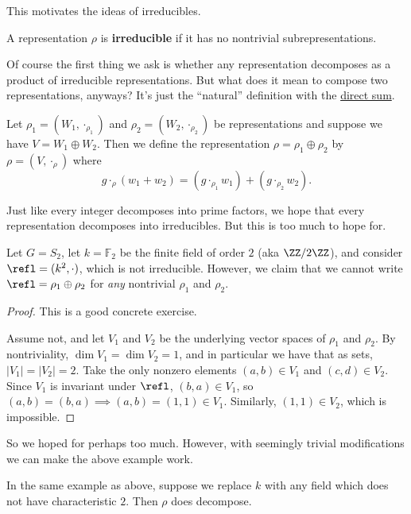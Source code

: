 This motivates the ideas of irreducibles.
\begin{definition}
	A representation $\rho$ is \textbf{irreducible} if it has no nontrivial subrepresentations.
\end{definition}

Of course the first thing we ask is whether any representation decomposes as a product of irreducible representations.
But what does it mean to compose two representations, anyways? It's just the ``natural'' definition with the \href{http://en.wikipedia.org/wiki/Direct_sum}{direct sum}.
\begin{definition}
	Let $\rho_1 = (W_1, \cdot_{\rho_1})$ and $\rho_2 = (W_2, \cdot_{\rho_2})$ be representations and suppose we have $V = W_1 \oplus W_2$.
	Then we define the representation $\rho = \rho_1 \oplus \rho_2$
	by $\rho = (V, \cdot_\rho)$ where
	\[
		g \cdot_\rho (w_1 + w_2)
		= (g \cdot_{\rho_1} w_1)
		+ (g \cdot_{\rho_2} w_2).
	\]
\end{definition}
Just like every integer decomposes into prime factors, we hope that every representation decomposes into irreducibles.
But this is too much to hope for.
\begin{example}
	Let $G = S_2$, let $k = \mathbb F_2$ be the finite field of order $2$ (aka $\ZZ/2\ZZ$), and consider $\refl = (k^2, \cdot)$, which is not irreducible.
	However, we claim that we cannot write $\refl = \rho_1 \oplus \rho_2$
	for \emph{any} nontrivial $\rho_1$ and $\rho_2$.
\end{example}
\begin{proof}
	This is a good concrete exercise.

	Assume not, and let $V_1$ and $V_2$ be the underlying vector spaces of $\rho_1$ and $\rho_2$.
	By nontriviality, $\dim V_1 = \dim V_2 = 1$,
	and in particular we have that as sets, $\left\lvert V_1 \right\rvert = \left\lvert V_2 \right\rvert = 2$.
	Take the only nonzero elements $(a,b) \in V_1$ and $(c,d) \in V_2$.
	Since $V_1$ is invariant under $\refl$, $(b,a) \in V_1$, so $(a,b) = (b,a) \implies (a,b) = (1,1) \in V_1$.
	Similarly, $(1,1) \in V_2$, which is impossible.
\end{proof}
So we hoped for perhaps too much.
However, with seemingly trivial modifications we can make the above example work.
\begin{example}
	In the same example as above, suppose we replace $k$ with any field which does not have characteristic $2$. Then $\rho$ does decompose.
\end{example}
